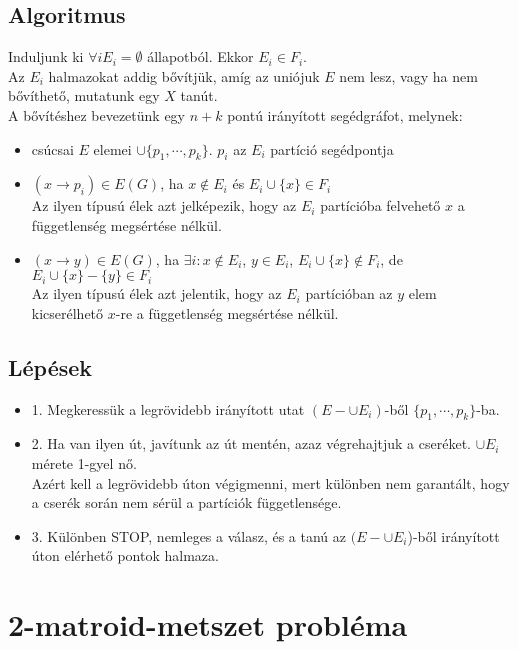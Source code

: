 \subsection*{Algoritmus}
Induljunk ki $\forall i E_{i}=\emptyset$ állapotból. Ekkor $E_{i}\in F_{i}$.\\
Az $E_{i}$ halmazokat addig bővítjük, amíg az uniójuk $E$ nem lesz, vagy ha nem bővíthető, mutatunk egy $X$ tanút.\\
\newline
A bővítéshez bevezetünk egy $n+k$ pontú irányított segédgráfot, melynek:
\begin{itemize}
\item csúcsai $E$ elemei $\cup\lbrace p_{1},\cdots ,p_{k}\rbrace$. $p_{i}$ az $E_{i}$ partíció segédpontja
\item $(x\rightarrow p_{i})\in E(G)$, ha $x\notin E_{i}$ és $E_{i}\cup\lbrace x\rbrace\in F_{i}$\\
Az ilyen típusú élek azt jelképezik, hogy az $E_{i}$ partícióba felvehető $x$ a függetlenség megsértése nélkül.
\item $(x\rightarrow y)\in E(G)$, ha $\exists i: x\notin E_{i}$, $y\in E_{i}$, $E_{i}\cup\lbrace x\rbrace\notin F_{i}$, de $E_{i}\cup\lbrace x\rbrace-\lbrace y\rbrace\in F_{i}$\\
Az ilyen típusú élek azt jelentik, hogy az $E_{i}$ partícióban az $y$ elem kicserélhető $x$-re a függetlenség megsértése nélkül.
\end{itemize}

\subsection*{Lépések}
\begin{itemize}
\item 1. Megkeressük a legrövidebb irányított utat $(E-\cup E_{i})$-ből $\lbrace p_{1},\cdots ,p_{k}\rbrace$-ba.
\item 2. Ha van ilyen út, javítunk az út mentén, azaz végrehajtjuk a cseréket. $\cup E_{i}$ mérete 1-gyel nő.\\
Azért kell a legrövidebb úton végigmenni, mert különben nem garantált, hogy a cserék során nem sérül a partíciók függetlensége.
\item 3. Különben STOP, nemleges a válasz, és a tanú az $(E-\cup E_{i}$)-ből irányított úton elérhető pontok halmaza.
\end{itemize}

\section*{2-matroid-metszet probléma}
